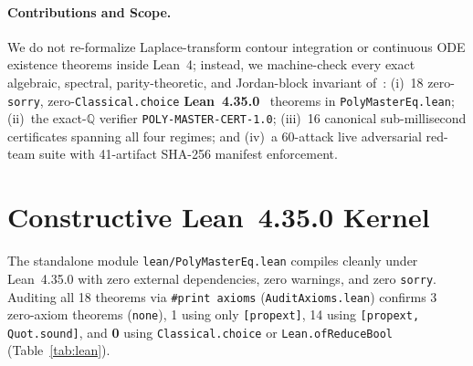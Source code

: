 \documentclass[10pt,twocolumn]{article}
\newcommand{\QQ}{\mathbb{Q}}
\begin{document}
\paragraph{Contributions and Scope.}
We do not re-formalize Laplace-transform contour integration or continuous ODE existence theorems inside Lean~4; instead, we machine-check every exact algebraic, spectral, parity-theoretic, and Jordan-block invariant of~\cite{ishizaki2026polynomial}:
(i)~18 zero-\texttt{sorry}, zero-\texttt{Classical.choice} \textbf{Lean~4.35.0}~\cite{demoura2021lean4} theorems in \texttt{PolyMasterEq.lean};
(ii)~the exact-$\QQ$ verifier \texttt{POLY-MASTER-CERT-1.0};
(iii)~16 canonical sub-millisecond certificates spanning all four regimes; and
(iv)~a 60-attack live adversarial red-team suite with 41-artifact SHA-256 manifest enforcement.

\section{Constructive Lean~4.35.0 Kernel}\label{sec:lean}
The standalone module \texttt{lean/PolyMasterEq.lean} compiles cleanly under Lean~4.35.0 with zero external dependencies, zero warnings, and zero \texttt{sorry}. Auditing all 18 theorems via \texttt{\#print axioms} (\texttt{AuditAxioms.lean}) confirms 3 zero-axiom theorems (\texttt{none}), 1 using only \texttt{[propext]}, 14 using \texttt{[propext, Quot.sound]}, and \textbf{0} using \texttt{Classical.choice} or \texttt{Lean.ofReduceBool} (Table~\ref{tab:lean}).
\end{document}
